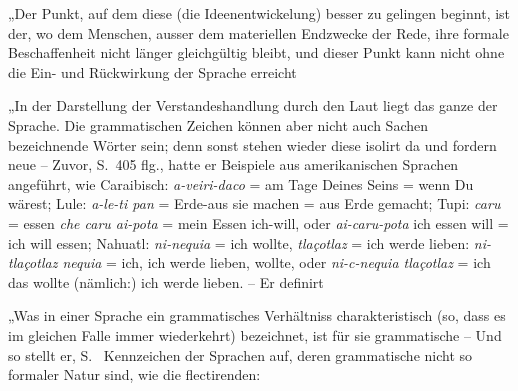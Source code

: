 
 „Der Punkt, auf dem diese (die Ideenentwickelung) besser zu gelingen beginnt, ist der, wo dem Menschen, ausser dem materiellen Endzwecke der Rede, ihre formale Beschaffenheit nicht länger gleichgültig bleibt, und dieser Punkt kann nicht ohne die Ein- und Rückwirkung der Sprache erreicht 

 „In der Darstellung der Verstandeshandlung durch den Laut liegt das ganze  der Sprache. Die grammatischen Zeichen können aber nicht auch Sachen bezeichnende Wörter sein; denn sonst stehen wieder diese isolirt da und fordern neue   – Zuvor, S.~405 flg., hatte er Beispiele aus amerikanischen Sprachen angeführt, wie Caraibisch: \textit{a-veiri-daco} = am Tage Deines Seins \label{fp.320} = wenn Du wärest; Lule: \textit{a-le-ti pan} = Erde-aus sie machen = aus Erde gemacht; Tupi: \textit{caru} = essen  \textit{che caru ai-pota} = mein Essen ich-will, oder \textit{ai-caru-pota} \fed{=} ich essen will = ich will essen; Nahuatl: \textit{ni-nequia} = ich wollte, \textit{tlaçotlaz} = ich werde lieben: \textit{ni-tlaçotlaz nequia} = ich, ich werde lieben, wollte, oder \textit{ni-c-nequia tlaçotlaz} = ich das wollte (nämlich:) ich werde lieben. – Er definirt

\largerpage[-2] „Was in einer Sprache ein grammatisches Verhältniss charakteristisch (so, dass es im gleichen Falle immer wiederkehrt) bezeichnet, ist für sie grammatische  – Und so stellt er, S.~ Kennzeichen der Sprachen auf, deren grammatische  nicht so formaler Natur sind, wie die flectirenden:

